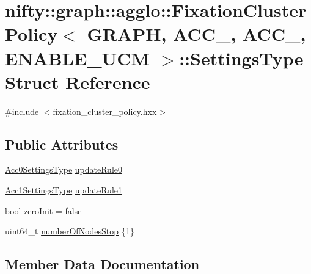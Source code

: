 \hypertarget{structnifty_1_1graph_1_1agglo_1_1FixationClusterPolicy_1_1SettingsType}{}\section{nifty\+:\+:graph\+:\+:agglo\+:\+:Fixation\+Cluster\+Policy$<$ G\+R\+A\+PH, A\+C\+C\+\_, A\+C\+C\+\_, E\+N\+A\+B\+L\+E\+\_\+\+U\+CM $>$\+:\+:Settings\+Type Struct Reference}
\label{structnifty_1_1graph_1_1agglo_1_1FixationClusterPolicy_1_1SettingsType}


{\ttfamily \#include $<$fixation\+\_\+cluster\+\_\+policy.\+hxx$>$}

\subsection*{Public Attributes}
\begin{DoxyCompactItemize}
\item 
\hyperlink{classnifty_1_1graph_1_1agglo_1_1FixationClusterPolicy_a2589a9fccad644c707b88aea81318195}{Acc0\+Settings\+Type} \hyperlink{structnifty_1_1graph_1_1agglo_1_1FixationClusterPolicy_1_1SettingsType_a2421dec9bfa087c02bac6e17f2392adc}{update\+Rule0}
\item 
\hyperlink{classnifty_1_1graph_1_1agglo_1_1FixationClusterPolicy_ae3cf188ccd118291fbc2b0038b59c672}{Acc1\+Settings\+Type} \hyperlink{structnifty_1_1graph_1_1agglo_1_1FixationClusterPolicy_1_1SettingsType_a97d0087c3f44a124f4d6c7d04947e823}{update\+Rule1}
\item 
bool \hyperlink{structnifty_1_1graph_1_1agglo_1_1FixationClusterPolicy_1_1SettingsType_a05d305057cf189b3d746e3d18710a980}{zero\+Init} = false
\item 
uint64\+\_\+t \hyperlink{structnifty_1_1graph_1_1agglo_1_1FixationClusterPolicy_1_1SettingsType_af653b92d22eed945aac1b7b51df95f55}{number\+Of\+Nodes\+Stop} \{1\}
\end{DoxyCompactItemize}


\subsection{Member Data Documentation}
\mbox{\label{structnifty_1_1graph_1_1agglo_1_1FixationClusterPolicy_1_1SettingsType_af653b92d22eed945aac1b7b51df95f55}} 
